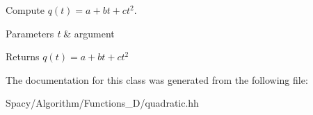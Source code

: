 Compute $q(t) = a + bt + ct^2 $. 


\begin{DoxyParams}{Parameters}
{\em t} & argument \\
\hline
\end{DoxyParams}
\begin{DoxyReturn}{Returns}
$q(t) = a + bt + ct^2 $ 
\end{DoxyReturn}


The documentation for this class was generated from the following file\+:\begin{DoxyCompactItemize}
\item 
Spacy/\+Algorithm/\+Functions\+\_\+D/quadratic.\+hh\end{DoxyCompactItemize}
